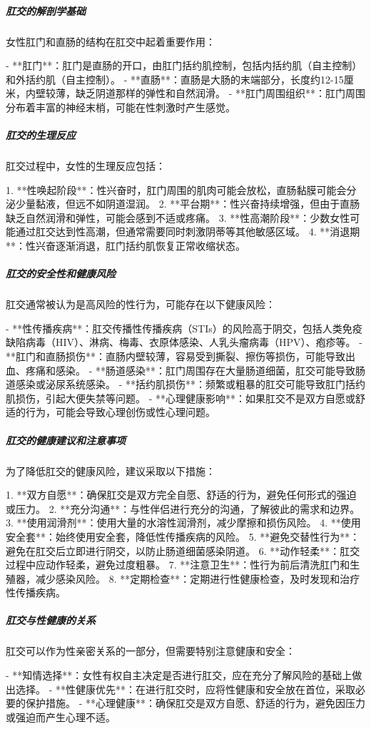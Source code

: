 \begin{enumerate}
\subparagraph{肛交的解剖学基础}

女性肛门和直肠的结构在肛交中起着重要作用：

- **肛门**：肛门是直肠的开口，由肛门括约肌控制，包括内括约肌（自主控制）和外括约肌（自主控制）。
- **直肠**：直肠是大肠的末端部分，长度约12-15厘米，内壁较薄，缺乏阴道那样的弹性和自然润滑。
- **肛门周围组织**：肛门周围分布着丰富的神经末梢，可能在性刺激时产生感觉。

\subparagraph{肛交的生理反应}

肛交过程中，女性的生理反应包括：

1. **性唤起阶段**：性兴奋时，肛门周围的肌肉可能会放松，直肠黏膜可能会分泌少量黏液，但远不如阴道湿润。
2. **平台期**：性兴奋持续增强，但由于直肠缺乏自然润滑和弹性，可能会感到不适或疼痛。
3. **性高潮阶段**：少数女性可能通过肛交达到性高潮，但通常需要同时刺激阴蒂等其他敏感区域。
4. **消退期**：性兴奋逐渐消退，肛门括约肌恢复正常收缩状态。

\subparagraph{肛交的安全性和健康风险}

肛交通常被认为是高风险的性行为，可能存在以下健康风险：

- **性传播疾病**：肛交传播性传播疾病（STIs）的风险高于阴交，包括人类免疫缺陷病毒（HIV）、淋病、梅毒、衣原体感染、人乳头瘤病毒（HPV）、疱疹等。
- **肛门和直肠损伤**：直肠内壁较薄，容易受到撕裂、擦伤等损伤，可能导致出血、疼痛和感染。
- **肠道感染**：肛门周围存在大量肠道细菌，肛交可能导致肠道感染或泌尿系统感染。
- **括约肌损伤**：频繁或粗暴的肛交可能导致肛门括约肌损伤，引起大便失禁等问题。
- **心理健康影响**：如果肛交不是双方自愿或舒适的行为，可能会导致心理创伤或性心理问题。

\subparagraph{肛交的健康建议和注意事项}

为了降低肛交的健康风险，建议采取以下措施：

1. **双方自愿**：确保肛交是双方完全自愿、舒适的行为，避免任何形式的强迫或压力。
2. **充分沟通**：与性伴侣进行充分的沟通，了解彼此的需求和边界。
3. **使用润滑剂**：使用大量的水溶性润滑剂，减少摩擦和损伤风险。
4. **使用安全套**：始终使用安全套，降低性传播疾病的风险。
5. **避免交替性行为**：避免在肛交后立即进行阴交，以防止肠道细菌感染阴道。
6. **动作轻柔**：肛交过程中应动作轻柔，避免过度粗暴。
7. **注意卫生**：性行为前后清洗肛门和生殖器，减少感染风险。
8. **定期检查**：定期进行性健康检查，及时发现和治疗性传播疾病。

\subparagraph{肛交与性健康的关系}

肛交可以作为性亲密关系的一部分，但需要特别注意健康和安全：

- **知情选择**：女性有权自主决定是否进行肛交，应在充分了解风险的基础上做出选择。
- **性健康优先**：在进行肛交时，应将性健康和安全放在首位，采取必要的保护措施。
- **心理健康**：确保肛交是双方自愿、舒适的行为，避免因压力或强迫而产生心理不适。


\end{enumerate}
